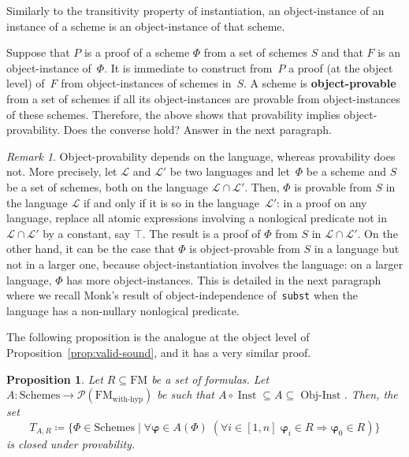 \documentclass[11pt]{article}
\newcommand*{\define}[1]{\textbf{#1}}%
\renewcommand*{\phi}{\varphi}
\newcommand*{\calL}{\mathcal{L}}
\newcommand*{\calP}{\mathcal{P}}
\newcommand*{\FM}{\mathrm{FM}}
\newcommand*{\Schemes}{\mathrm{Schemes}}
\newcommand*{\FMwithhyp}{{\FM_{\mathrm{with}\text{-}\mathrm{hyp}}}}
\DeclareMathOperator{\Inst}{Inst}
\theoremstyle{plain}
\newtheorem{proposition}[theorem]{Proposition}
\theoremstyle{definition}
\theoremstyle{remark}
\newtheorem{remark}[theorem]{Remark}
\begin{document}
Similarly to the transitivity property of instantiation, an object-instance of an instance of a
scheme is an object-instance of that scheme.

Suppose that $P$ is a proof of a scheme $\Phi$ from a set of schemes $S$ and that $F$ is an
object-instance of~$\Phi$. It is immediate to construct from~$P$ a proof (at the object level) of~$F$
from object-instances of schemes in~$S$. A scheme is \define{object-provable} from a set of schemes
if all its object-instances are provable from object-instances of these schemes. Therefore, the above
shows that provability implies object-provability. Does the converse hold? Answer in the next
paragraph.

\begin{remark}
\label{rmk:language}
Object-provability depends on the language, whereas provability does not.
More precisely, let $\calL$ and $\calL'$ be two languages and let~$\Phi$ be a scheme and $S$ be a
set of schemes, both on the language $\calL \cap \calL'$.
Then, $\Phi$ is provable from $S$ in the language $\calL$ if and only if it is so in the
language~$\calL'$: in a proof on any language, replace all atomic expressions involving a nonlogical
predicate not in $\calL \cap \calL'$ by a constant, say $\top$.
The result is a proof of $\Phi$ from $S$ in $\calL \cap \calL'$.
On the other hand, it can be the case that $\Phi$ is object-provable from $S$ in a language but not
in a larger one, because object-instantiation involves the language: on a larger language, $\Phi$
has more object-instances.
This is detailed in the next paragraph where we recall Monk's result of object-independence
of~\texttt{subst} when the language has a non-nullary nonlogical predicate.
\end{remark}

The following proposition is the analogue at the object level of Proposition~\ref{prop:valid-sound},
and it has a very similar proof.

\begin{proposition}\label{prop:valid-sound-obj}
Let $R \subseteq \FM$ be a set of formulas.
Let $A \colon \Schemes \to \calP(\FMwithhyp)$ be such that
$A \circ \Inst \subseteq A \subseteq \operatorname{Obj-Inst}$.
Then, the set
\begin{equation}
T_{A, R} \coloneqq \{ \Phi \in \Schemes \mid
\forall \bm\phi \in A(\Phi) \;
(\forall i \in [1, n] \; \bm\phi_i \in R \Rightarrow \bm\phi_0 \in R) \}
\end{equation}
is closed under provability.
\end{proposition}
\end{document}
